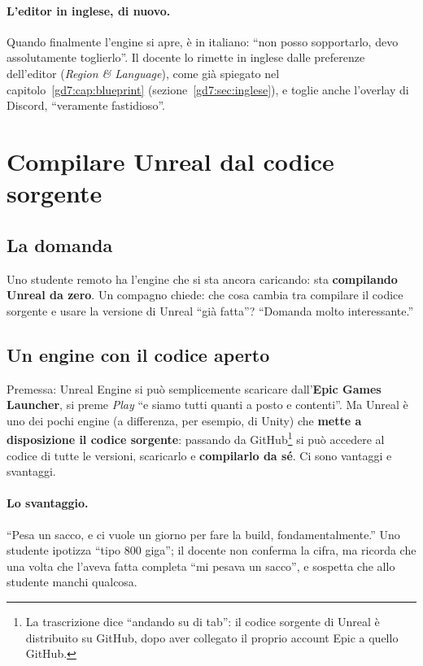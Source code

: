 \paragraph{L'editor in inglese, di nuovo.} Quando finalmente l'engine si apre,
è in italiano: ``non posso sopportarlo, devo assolutamente toglierlo''. Il
docente lo rimette in inglese dalle preferenze dell'editor (\emph{Region \&
Language}), come già spiegato nel capitolo~\ref{gd7:cap:blueprint}
(sezione~\ref{gd7:sec:inglese}), e toglie anche l'overlay di Discord, ``veramente
fastidioso''.

\section{Compilare Unreal dal codice sorgente}
\label{gd12:sec:sorgente}

\subsection{La domanda}

Uno studente remoto ha l'engine che si sta ancora caricando: sta
\textbf{compilando Unreal da zero}. Un compagno chiede: che cosa cambia tra
compilare il codice sorgente e usare la versione di Unreal ``già fatta''?
``Domanda molto interessante.''

\subsection{Un engine con il codice aperto}

Premessa: Unreal Engine si può semplicemente scaricare dall'\textbf{Epic Games
Launcher}, si preme \emph{Play} ``e siamo tutti quanti a posto e contenti''. Ma
Unreal è uno dei pochi engine (a differenza, per esempio, di Unity) che
\textbf{mette a disposizione il codice sorgente}: passando da
GitHub\footnote{La trascrizione dice ``andando su di tab'': il codice sorgente
di Unreal è distribuito su GitHub, dopo aver collegato il proprio account Epic
a quello GitHub.} si può accedere al codice di tutte le versioni,
scaricarlo e \textbf{compilarlo da sé}. Ci sono vantaggi e svantaggi.

\paragraph{Lo svantaggio.} ``Pesa un sacco, e ci vuole un giorno per fare la
build, fondamentalmente.'' Uno studente ipotizza ``tipo 800 giga''; il docente
non conferma la cifra, ma ricorda che una volta che l'aveva fatta completa
``mi pesava un sacco'', e sospetta che allo studente manchi qualcosa.

